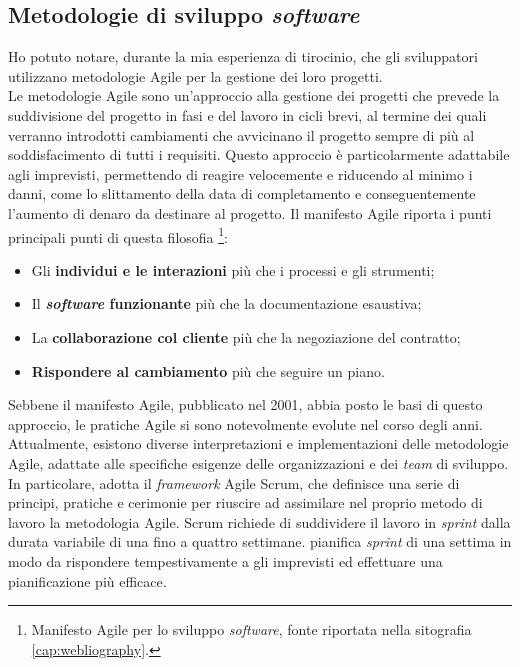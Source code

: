 \subsection{Metodologie di sviluppo \textit{software}}
Ho potuto notare, durante la mia esperienza di tirocinio, che gli sviluppatori utilizzano metodologie Agile per la gestione dei loro progetti.\\
Le metodologie Agile sono un'approccio alla gestione dei progetti che prevede la suddivisione del progetto 
in fasi e del lavoro in cicli brevi, al termine dei quali verranno introdotti cambiamenti che avvicinano il 
progetto sempre di più al soddisfacimento di tutti i requisiti. Questo approccio è particolarmente adattabile agli imprevisti, permettendo di reagire velocemente 
e riducendo al minimo i danni, come lo slittamento della data di completamento e conseguentemente l'aumento di denaro da destinare al progetto. 
Il manifesto Agile riporta i punti principali punti di questa filosofia
\footnote{Manifesto Agile per lo sviluppo \textit{software}, fonte riportata nella sitografia \ref{cap:webliography}.}:
\begin{itemize}
      \item Gli \textbf{individui e le interazioni} più che i processi e gli strumenti;
      \item Il \textbf{\textit{software} funzionante} più che la documentazione esaustiva;
      \item La \textbf{collaborazione col cliente} più che la negoziazione del contratto;
      \item \textbf{Rispondere al cambiamento} più che seguire un piano.
\end{itemize}
Sebbene il manifesto Agile, pubblicato nel 2001, abbia posto le basi di questo approccio, le pratiche Agile 
si sono notevolmente evolute nel corso degli anni. Attualmente, esistono diverse interpretazioni e 
implementazioni delle metodologie Agile, adattate alle specifiche esigenze delle organizzazioni e dei 
\textit{team} di sviluppo.
In particolare, {\company} adotta il \textit{framework} Agile Scrum, che definisce una 
serie di principi, pratiche e cerimonie per riuscire ad assimilare nel proprio metodo di lavoro la metodologia Agile. 
Scrum richiede di suddividere il lavoro in \textit{sprint} dalla durata variabile di una fino a quattro settimane. {\company} pianifica
\textit{sprint} di una settima in modo da rispondere tempestivamente a gli imprevisti ed effettuare una pianificazione più efficace.

